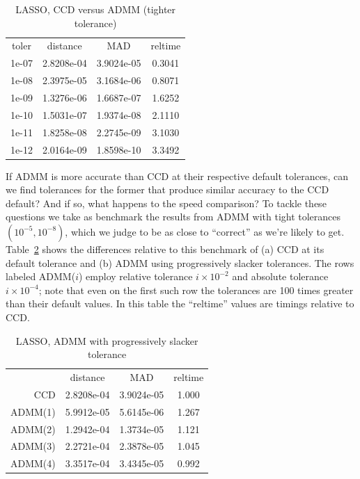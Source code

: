 \documentclass{article}
\begin{document}

\begin{table}[htbp]
\begin{center}
\begin{tabular}{cccc}
toler & distance & MAD & reltime \\[4pt]
1e-07 & 2.8208e-04 & 3.9024e-05 & 0.3041 \\
1e-08 & 2.3975e-05 & 3.1684e-06 & 0.8071 \\
1e-09 & 1.3276e-06 & 1.6687e-07 & 1.6252 \\
1e-10 & 1.5031e-07 & 1.9374e-08 & 2.1110 \\
1e-11 & 1.8258e-08 & 2.2745e-09 & 3.1030 \\
1e-12 & 2.0164e-09 & 1.8598e-10 & 3.3492 \\
\end{tabular}
\caption{LASSO, CCD versus ADMM (tighter tolerance)}
\label{tab:admm2-ccd}
\end{center}
\end{table}

If ADMM is more accurate than CCD at their respective default
tolerances, can we find tolerances for the former that produce similar
accuracy to the CCD default? And if so, what happens to the speed
comparison? To tackle these questions we take as benchmark the results
from ADMM with tight tolerances $(10^{-5}, 10^{-8})$, which we judge
to be as close to ``correct'' as we're likely to
get. Table~\ref{tab:admm-seq} shows the differences relative to this
benchmark of (a) CCD at its default tolerance and (b) ADMM using
progressively slacker tolerances. The rows labeled ADMM($i$) employ
relative tolerance $i\times 10^{-2}$ and absolute tolerance
$i\times 10^{-4}$; note that even on the first such row the tolerances
are 100 times greater than their default values. In this table the
``reltime'' values are timings relative to CCD.

\begin{table}[htbp]
\begin{center}
\begin{tabular}{rccc}
  & distance & MAD & reltime \\[4pt]
CCD & 2.8208e-04 & 3.9024e-05 & 1.000 \\
ADMM(1) & 5.9912e-05 & 5.6145e-06 & 1.267 \\
ADMM(2) & 1.2942e-04 & 1.3734e-05 & 1.121 \\
ADMM(3) & 2.2721e-04 & 2.3878e-05 & 1.045 \\
ADMM(4) & 3.3517e-04 & 3.4345e-05 & 0.992 \\
\end{tabular}
\caption{LASSO, ADMM with progressively slacker tolerance}
\label{tab:admm-seq}
\end{center}
\end{table}
\end{document}
